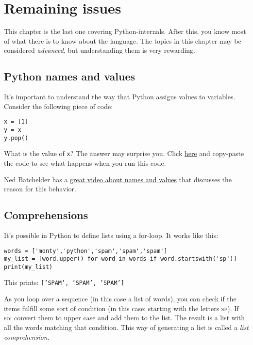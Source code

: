 \documentclass[12pt]{book}
\begin{document}
\chapter{Remaining issues}

This chapter is the last one covering Python-internals. After this, you know most of what there is to know about the language. The topics in this chapter may be considered \emph{advanced}, but understanding them is very rewarding.

\section{Python names and values}

It's important to understand the way that Python assigns values to variables. Consider the following piece of code:

\begin{lstlisting}
x = [1]
y = x
y.pop()
\end{lstlisting}

What is the value of \texttt{x}? The answer may surprise you. Click \href{http://www.pythontutor.com/visualize.html\#mode=edit}{here} and copy-paste the code to see what happens when you run this code.

Ned Batchelder has a \href{http://nedbatchelder.com/text/names1.html}{great video about names and values} that discusses the reason for this behavior.

\section{Comprehensions}
It's possible in Python to define lists using a for-loop. It works like this:

\begin{lstlisting}
words = ['monty','python','spam','spam','spam']
my_list = [word.upper() for word in words if word.startswith('sp')]
print(my_list)
\end{lstlisting}

This prints: \texttt{{[}'SPAM',\ 'SPAM',\ 'SPAM'{]}}

As you loop over a sequence (in this case a list of words), you can check if the items fulfill some sort of condition (in this case: starting with the letters \textsc{sp}). If so: convert them to upper case and add them to the list. The result is a list with all the words matching that condition. This way of generating a list is called a \emph{list comprehension}.
\end{document}

